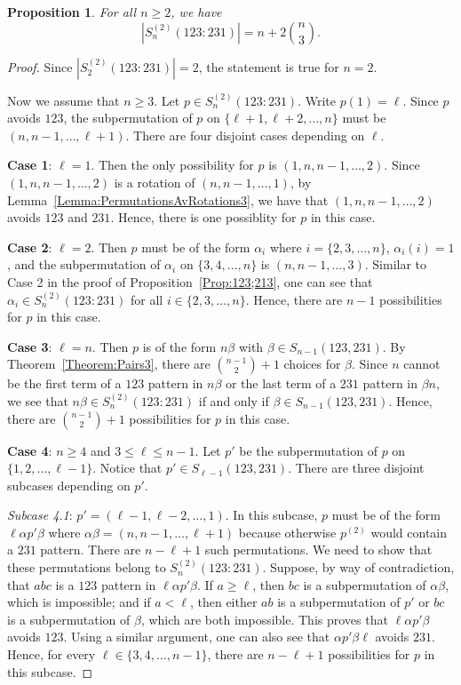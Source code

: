 \documentclass[11pt]{article}
\newtheorem{proposition}[theorem]{Proposition}
\theoremstyle{definition}
\numberwithin{equation}{section}
\begin{document}
\begin{proposition}\label{Prop:123;231}
    For all $n\geq2$, we have
    \[
    |S_n^{(2)}(123:231)|=n + 2 \binom{n}{3}.
    \]
\end{proposition}
\begin{proof}
Since $|S_2^{(2)}(123:231)|=2$, the statement is true for $n=2$. 

Now we assume that $n\geq3$. Let $p\in S_n^{(2)}(123:231)$. Write $p(1)=\ell$. Since $p$ avoids $123$, the subpermutation of $p$ on $\{\ell+1,\ell+2,\ldots,n\}$ must be $(n,n-1,\ldots,\ell+1)$. There are four 
disjoint cases depending on $\ell$.

    \textbf{Case 1}: $\ell=1$. Then the only possibility for $p$ is $(1,n,n-1,\ldots,2)$. Since $(1,n,n-1,\ldots,2)$ is a rotation of $(n,n-1,\ldots,1)$, by Lemma~\ref{Lemma:PermutationsAvRotations3}, we have that $(1,n,n-1,\ldots,2)$ avoids $123$ and $231$. Hence, there is one possiblity for $p$ in this case.

    {\bf Case 2}: $\ell=2$. Then $p$ must be of the form $\alpha_i$ where $i=\{2,3,\ldots,n\}$, $\alpha_i(i)=1$, and the subpermutation of $\alpha_i$ on $\{3,4,\ldots,n\}$ is $(n,n-1,\ldots,3)$. Similar to Case 2 in the proof of Proposition~\ref{Prop:123;213}, one can see that $\alpha_i\in S_n^{(2)}(123:231)$ for all $i\in\{2,3,\ldots,n\}$. Hence, there are $n-1$ possibilities for $p$ in this case.


    {\bf Case 3}: $\ell=n$. Then $p$ is of the form $n\beta$ with $\beta\in S_{n-1}(123,231)$. By Theorem~\ref{Theorem:Pairs3}, there are $\binom{n-1}{2}+1$ choices for $\beta$. Since $n$ cannot be the first term of a $123$ pattern in $n\beta$ or the last term of a $231$ pattern in $\beta n$, we see that $n\beta\in S_n^{(2)}(123:231)$ if and only if $\beta\in S_{n-1}(123,231)$. Hence, there are $\binom{n-1}{2}+1$ possibilities for $p$ in this case.

    {\bf Case 4}: $n\geq4$ and $3\leq \ell\leq n-1$. Let $p'$ be the subpermutation of $p$ on $\{1,2,\ldots,\ell-1\}$. Notice that $p'\in S_{\ell-1}(123,231)$. There are three disjoint subcases depending on $p'$.

    {\it Subcase 4.1}: $p'=(\ell-1,\ell-2,\ldots,1)$. In this subcase, $p$ must be of the form $\ell\alpha p'\beta$ where $\alpha\beta=(n,n-1,\ldots,\ell+1)$ because otherwise $p^{(2)}$ would contain a $231$ pattern. There are $n-\ell+1$ such permutations. We need to show that these permutations belong to $S_n^{(2)}(123:231)$. 
Suppose, by way of contradiction, that $abc$ is a $123$ pattern in $\ell\alpha p'\beta$. If $a\geq\ell$, then $bc$ is a subpermutation of $\alpha\beta$, which is impossible; and if $a<\ell$, then either $ab$ is a subpermutation of $p'$ or $bc$ is a subpermutation of $\beta$, which are both impossible. This proves that $\ell\alpha p'\beta$ avoids $123$. Using a similar argument, one can also see that $\alpha p'\beta\ell$ avoids $231$. Hence, for every $\ell\in\{3,4,\ldots,n-1\}$, there are $n-\ell+1$ possibilities for $p$ in this subcase.
    

\end{proof}
\end{document}
